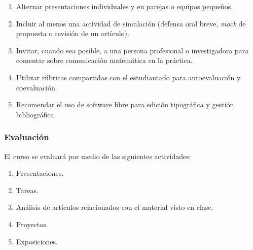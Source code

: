 \begin{refsection}
\begin{enumerate}
    \item Alternar presentaciones individuales y en parejas o equipos pequeños.
    \item Incluir al menos una actividad de simulación (defensa oral breve, \emph{mock} de propuesta o revisión de un artículo).
    \item Invitar, cuando sea posible, a una persona profesional o investigadora para comentar sobre comunicación matemática en la práctica.
    \item Utilizar rúbricas compartidas con el estudiantado para autoevaluación y coevaluación.
    \item Recomendar el uso de software libre para edición tipográfica y gestión bibliográfica.
\end{enumerate}





\subsubsection*{Evaluación}

El curso se evaluará por medio de las siguientes actividades:

\begin{enumerate}
\item Presentaciones.
\item Tareas.
\item Análisis de artículos relacionados con el material visto en clase.
\item Proyectos.
\item Exposiciones.
\end{enumerate}


\end{refsection}
